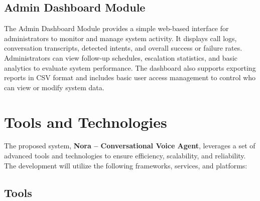 \documentclass[12pt,a4paper]{report}
\begin{document}
\subsection{Admin Dashboard Module}

The Admin Dashboard Module provides a simple web-based interface for administrators to monitor and manage system activity. It displays call logs, conversation transcripts, detected intents, and overall success or failure rates. Administrators can view follow-up schedules, escalation statistics, and basic analytics to evaluate system performance. The dashboard also supports exporting reports in CSV format and includes basic user access management to control who can view or modify system data.


\section{Tools and Technologies}

The proposed system, \textbf{Nora – Conversational Voice Agent}, leverages a set of advanced tools and technologies to ensure efficiency, scalability, and reliability. The development will utilize the following frameworks, services, and platforms:

\subsection{Tools}
\end{document}
